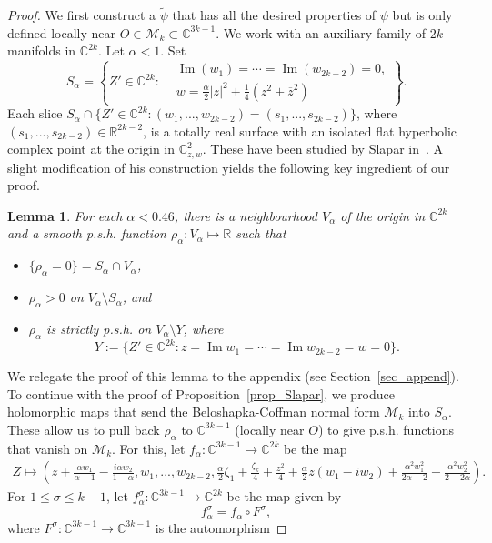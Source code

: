 \documentclass[10pt]{amsart}
\numberwithin{equation}{section}
\theoremstyle{definition}
\theoremstyle{definition}
\theoremstyle{plain}
\newtheorem{lemma}[theorem]{Lemma}
\newcommand{\bes} {\begin{equation*}}
\newcommand{\ees} {\end{equation*}}
\newcommand{\be} {\begin{equation}}
\newcommand{\ee} {\end{equation}}
\newcommand{\bc}{\mathcal{M}}
\newcommand{\zbar}{\overline{z}}
\newcommand{\ima}{\operatorname{Im}}
\newcommand{\wt}{\widetilde}
\newcommand{\CC}{\mathbb{C}^2}
\newcommand{\C} {\mathbb{C}}
\newcommand{\rl}{\mathbb{R}}
\begin{document}
\begin{proof} We first construct a $\wt\psi$ that has all the desired properties of $\psi$ but is only defined locally  near $O\in\bc_k\subset\C^{3k-1}$. We work with an auxiliary family of $2k$-manifolds in $\C^{2k}$. Let $\alpha<1$. Set
	\bes
		S_\alpha=\left\{Z'\in\C^{2k}:
			\begin{aligned}
				&\ima(w_1)=\cdots=\ima(w_{2k-2})=0,\\
					&w=\frac{\alpha}{2}|z|^2+\frac{1}{4}(z^2+\zbar^2)
			\end{aligned}
		\right\}.
	\ees
Each slice $S_\alpha\cap\{Z'\in\C^{2k}:(w_1,...,w_{2k-2})=(s_1,...,s_{2k-2})\}$, where $(s_1,...,s_{2k-2})\in\rl^{2k-2}$, is a totally real surface with an isolated flat hyperbolic complex point at the origin in $\CC_{z,w}$. These have been studied by Slapar in~\cite{Sl04}. A slight modification of his construction yields the following key ingredient of our proof.  

\begin{lemma}\label{lem_Slaparfn}
For each $\alpha<0.46$, there is a neighbourhood $V_\alpha$ of the origin in $\C^{2k}$ and a smooth p.s.h. function $\rho_\alpha:V_\alpha\mapsto \rl$ such that
\renewcommand\labelitemi{$\boldsymbol *$}
	\begin{itemize}
		\item  $\{\rho_\alpha=0\}=S_\alpha\cap V_\alpha$,
		\item  $\rho_\alpha> 0$ on $V_\alpha\setminus S_\alpha$, and
		\item  $\rho_\alpha$ is strictly p.s.h. on $V_\alpha\setminus Y$, where 
				\be\label{eq_sing}
					Y:=\{Z'\in \C^{2k}:z=\ima w_1=\cdots=\ima w_{2k-2}=w=0\}.
				\ee
	\end{itemize}
\end{lemma}

We relegate the proof of this lemma to the appendix (see Section~\ref{sec_append}). To continue with the proof of Proposition~\ref{prop_Slapar}, we produce holomorphic maps that send the Beloshapka-Coffman normal form $\bc_k$ into $S_\alpha$. These allow us to pull back $\rho_\alpha$ to $\C^{3k-1}$ (locally near $O$) to give p.s.h. functions that vanish on $\bc_k$. For this, let $f_\alpha:\C^{3k-1}\rightarrow\C^{2k}$ be the map 
	\begin{align*}
		Z\mapsto \left(z+\tfrac{\alpha w_1}{\alpha+1}
				-\tfrac{i\alpha w_2}{1-\alpha}, w_1,...,w_{2k-2},
		\tfrac{\alpha}{2}\zeta_1+\tfrac{\zeta_k}{4}+\tfrac{z^2}{4}
		+\tfrac{\alpha}{2}z(w_1-iw_2)+\tfrac{\alpha^2 w_1^2}{2\alpha+2}-\tfrac{\alpha^2 w_2^2}{2-2\alpha}\right).
	\end{align*}
For $1\leq \sigma\leq {k-1}$, let $f^\sigma_\alpha:\C^{3k-1}\rightarrow\C^{2k}$ be the map given by
	\bes
		f^\sigma_\alpha=f_\alpha\circ F^\sigma,
	\ees
where $F^\sigma:\C^{3k-1}\rightarrow\C^{3k-1}$ is the automorphism
	

\end{proof}
\end{document}
